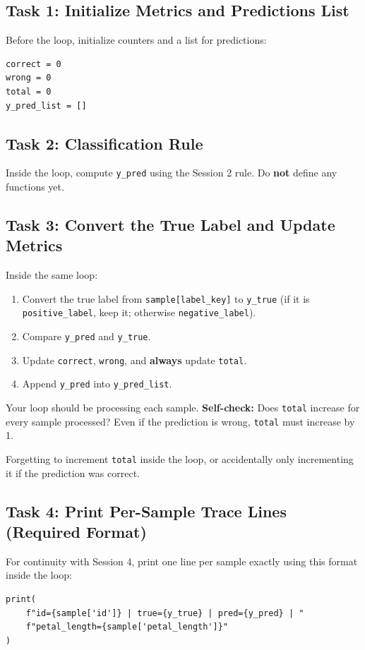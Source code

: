 \subsection{Task 1: Initialize Metrics and Predictions List}
Before the loop, initialize counters and a list for predictions:
\begin{verbatim}
correct = 0
wrong = 0
total = 0
y_pred_list = []
\end{verbatim}

\subsection{Task 2: Classification Rule}
\label{sec:ses3_required_bridge}
Inside the loop, compute \texttt{y\_pred} using the Session 2 rule. Do \textbf{not} define any functions yet.

\subsection{Task 3: Convert the True Label and Update Metrics}
Inside the same loop:
\begin{enumerate}
    \item Convert the true label from \texttt{sample[label\_key]} to \texttt{y\_true} (if it is \texttt{positive\_label}, keep it; otherwise \texttt{negative\_label}).
    \item Compare \texttt{y\_pred} and \texttt{y\_true}.
    \item Update \texttt{correct}, \texttt{wrong}, and \textbf{always} update \texttt{total}.
    \item Append \texttt{y\_pred} into \texttt{y\_pred\_list}.
\end{enumerate}

\begin{tcolorbox}[title=Checkpoint]
Your loop should be processing each sample. \textbf{Self-check:} Does \texttt{total} increase for every sample processed? Even if the prediction is wrong, \texttt{total} must increase by 1.
\end{tcolorbox}
\begin{tcolorbox}[title=Common Mistakes]
Forgetting to increment \texttt{total} inside the loop, or accidentally only incrementing it if the prediction was correct.
\end{tcolorbox}

\subsection{Task 4: Print Per-Sample Trace Lines (Required Format)}
For continuity with Session 4, print one line per sample exactly using this format inside the loop:
\begin{verbatim}
print(
    f"id={sample['id']} | true={y_true} | pred={y_pred} | "
    f"petal_length={sample['petal_length']}"
)
\end{verbatim}

